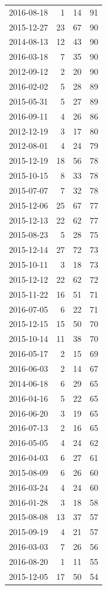 \begin{tabular}{lrrr}
2016-08-18 & 1 & 14 & 91 \\
2015-12-27 & 23 & 67 & 90 \\
2014-08-13 & 12 & 43 & 90 \\
2016-03-18 & 7 & 35 & 90 \\
2012-09-12 & 2 & 20 & 90 \\
2016-02-02 & 5 & 28 & 89 \\
2015-05-31 & 5 & 27 & 89 \\
2016-09-11 & 4 & 26 & 86 \\
2012-12-19 & 3 & 17 & 80 \\
2012-08-01 & 4 & 24 & 79 \\
2015-12-19 & 18 & 56 & 78 \\
2015-10-15 & 8 & 33 & 78 \\
2015-07-07 & 7 & 32 & 78 \\
2015-12-06 & 25 & 67 & 77 \\
2015-12-13 & 22 & 62 & 77 \\
2015-08-23 & 5 & 28 & 75 \\
2015-12-14 & 27 & 72 & 73 \\
2015-10-11 & 3 & 18 & 73 \\
2015-12-12 & 22 & 62 & 72 \\
2015-11-22 & 16 & 51 & 71 \\
2016-07-05 & 6 & 22 & 71 \\
2015-12-15 & 15 & 50 & 70 \\
2015-10-14 & 11 & 38 & 70 \\
2016-05-17 & 2 & 15 & 69 \\
2016-06-03 & 2 & 14 & 67 \\
2014-06-18 & 6 & 29 & 65 \\
2016-04-16 & 5 & 22 & 65 \\
2016-06-20 & 3 & 19 & 65 \\
2016-07-13 & 2 & 16 & 65 \\
2016-05-05 & 4 & 24 & 62 \\
2016-04-03 & 6 & 27 & 61 \\
2015-08-09 & 6 & 26 & 60 \\
2016-03-24 & 4 & 24 & 60 \\
2016-01-28 & 3 & 18 & 58 \\
2015-08-08 & 13 & 37 & 57 \\
2015-09-19 & 4 & 21 & 57 \\
2016-03-03 & 7 & 26 & 56 \\
2016-08-20 & 1 & 11 & 55 \\
2015-12-05 & 17 & 50 & 54 \\

\end{tabular}
